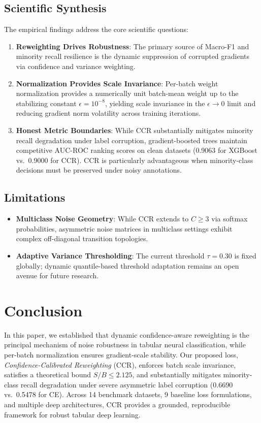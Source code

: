 \documentclass[preprint,12pt]{elsarticle}
\begin{document}
\subsection{Scientific Synthesis}
The empirical findings address the core scientific questions:
\begin{enumerate}
    \item \textbf{Reweighting Drives Robustness}: The primary source of Macro-F1 and minority recall resilience is the dynamic suppression of corrupted gradients via confidence and variance weighting.
    \item \textbf{Normalization Provides Scale Invariance}: Per-batch weight normalization provides a numerically unit batch-mean weight up to the stabilizing constant $\epsilon = 10^{-8}$, yielding scale invariance in the $\epsilon \to 0$ limit and reducing gradient norm volatility across training iterations.
    \item \textbf{Honest Metric Boundaries}: While CCR substantially mitigates minority recall degradation under label corruption, gradient-boosted trees maintain competitive AUC-ROC ranking scores on clean datasets (0.9063 for XGBoost vs.\ 0.9000 for CCR). CCR is particularly advantageous when minority-class decisions must be preserved under noisy annotations.
\end{enumerate}

\subsection{Limitations}
\begin{itemize}
    \item \textbf{Multiclass Noise Geometry}: While CCR extends to $C \ge 3$ via softmax probabilities, asymmetric noise matrices in multiclass settings exhibit complex off-diagonal transition topologies.
    \item \textbf{Adaptive Variance Thresholding}: The current threshold $\tau=0.30$ is fixed globally; dynamic quantile-based threshold adaptation remains an open avenue for future research.
\end{itemize}


\section{Conclusion}
\label{sec:conclusion}

In this paper, we established that dynamic confidence-aware reweighting is the principal mechanism of noise robustness in tabular neural classification, while per-batch normalization ensures gradient-scale stability. Our proposed loss, \emph{Confidence-Calibrated Reweighting} (CCR), enforces batch scale invariance, satisfies a theoretical bound $S/B \le 2.125$, and substantially mitigates minority-class recall degradation under severe asymmetric label corruption (0.6690 vs.\ 0.5478 for CE). Across 14 benchmark datasets, 9 baseline loss formulations, and multiple deep architectures, CCR provides a grounded, reproducible framework for robust tabular deep learning.
\end{document}
